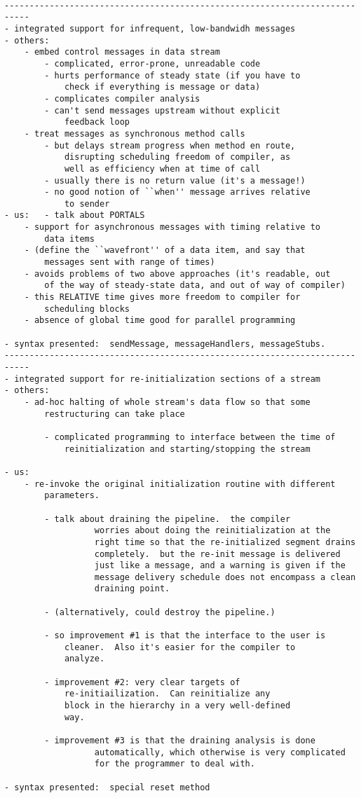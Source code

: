 \begin{verbatim}

---------------------------------------------------------------------------
- integrated support for infrequent, low-bandwidh messages
- others:
	- embed control messages in data stream
		- complicated, error-prone, unreadable code
		- hurts performance of steady state (if you have to 
			check if everything is message or data)
		- complicates compiler analysis
		- can't send messages upstream without explicit
			feedback loop
	- treat messages as synchronous method calls
		- but delays stream progress when method en route, 
			disrupting scheduling freedom of compiler, as
			well as efficiency when at time of call
		- usually there is no return value (it's a message!)
		- no good notion of ``when'' message arrives relative
			to sender
- us: 	- talk about PORTALS
	- support for asynchronous messages with timing relative to
		data items
	- (define the ``wavefront'' of a data item, and say that
		messages sent with range of times)
	- avoids problems of two above approaches (it's readable, out
		of the way of steady-state data, and out of way of compiler)
	- this RELATIVE time gives more freedom to compiler for
		scheduling blocks
	- absence of global time good for parallel programming

- syntax presented:  sendMessage, messageHandlers, messageStubs.
---------------------------------------------------------------------------
- integrated support for re-initialization sections of a stream
- others:	
	- ad-hoc halting of whole stream's data flow so that some
		restructuring can take place
		
		- complicated programming to interface between the time of
			reinitialization and starting/stopping the stream

- us:
	- re-invoke the original initialization routine with different 
		parameters.

		- talk about draining the pipeline.  the compiler
                  worries about doing the reinitialization at the
                  right time so that the re-initialized segment drains
                  completely.  but the re-init message is delivered
                  just like a message, and a warning is given if the
                  message delivery schedule does not encompass a clean
                  draining point.

		- (alternatively, could destroy the pipeline.)

		- so improvement #1 is that the interface to the user is 
			cleaner.  Also it's easier for the compiler to 
			analyze.

		- improvement #2: very clear targets of
			re-initiailization.  Can reinitialize any
			block in the hierarchy in a very well-defined
			way.

		- improvement #3 is that the draining analysis is done
                  automatically, which otherwise is very complicated
                  for the programmer to deal with.

- syntax presented:  special reset method

\end{verbatim}






